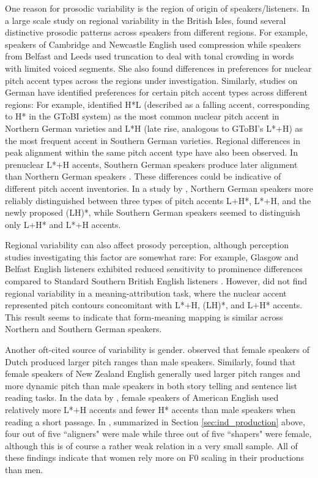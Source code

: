 One reason for prosodic variability is the region of origin of speakers/listeners. In a large scale study on regional variability in the British Isles, \citet{grabeIntonationalVariationUrban2004} found several distinctive prosodic patterns across speakers from different regions. For example, speakers of Cambridge and Newcastle English used compression while speakers from Belfast and Leeds used truncation to deal with tonal crowding in words with limited voiced segments. She also found differences in preferences for nuclear pitch accent types across the regions under investigation. Similarly, studies on German have identified preferences for certain pitch accent types across different regions: For example, \citet{petersIntonationDeutscherRegionalsprachen2006} identified H*L (described as a falling accent, corresponding to H* in the GToBI system) as the most common nuclear pitch accent in Northern German varieties and L*H (late rise, analogous to GToBI's L*+H) as the most frequent accent in Southern German varieties. Regional differences in peak alignment within the same pitch accent type have also been observed. In prenuclear L*+H accents, Southern German speakers produce later alignment than Northern German speakers \citep{attererPhoneticsPhonologySegmental2004}. These differences could be indicative of different pitch accent inventories. In a study by \citet{zahner-ritterThreeKindsRisingFalling2022}, Northern German speakers more reliably distinguished between three types of pitch accents L+H*, L*+H, and the newly proposed (LH)*, while Southern German speakers seemed to distinguish only L+H* and L*+H accents.

Regional variability can also affect prosody perception, although perception studies investigating this factor are somewhat rare: For example, Glasgow and Belfast English listeners exhibited reduced sensitivity to prominence differences compared to Standard Southern British English listeners \citep{jeonPerceptionPitchHeight2024}. However, \citet{zahner-ritterThreeKindsRisingFalling2022} did not find regional variability in a meaning-attribution task, where the nuclear accent represented pitch contours concomitant with L*+H, (LH)*, and L+H* accents. This result seems to indicate that form-meaning mapping is similar across Northern and Southern German speakers. 

Another oft-cited source of variability is gender. \citet{haanMaleVsFemale1999} observed that female speakers of Dutch produced larger pitch ranges than male speakers. Similarly, \citet{dalyPitchingItDifferently2001} found that female speakers of New Zealand English generally used larger pitch ranges and more dynamic pitch than male speakers in both story telling and sentence list reading tasks. In the data by \citet{clopperEffectsGenderRegional2011}, female speakers of American English used relatively more L*+H accents and fewer H* accents than male speakers when reading a short passage. In \citet{niebuhrAreThereShapers2011}, summarized in Section \ref{sec:ind_production} above, four out of five ``aligners" were male while three out of five ``shapers" were female, although this is of course a rather weak relation in a very small sample. All of these findings indicate that women rely more on F0 scaling in their productions than men. 

